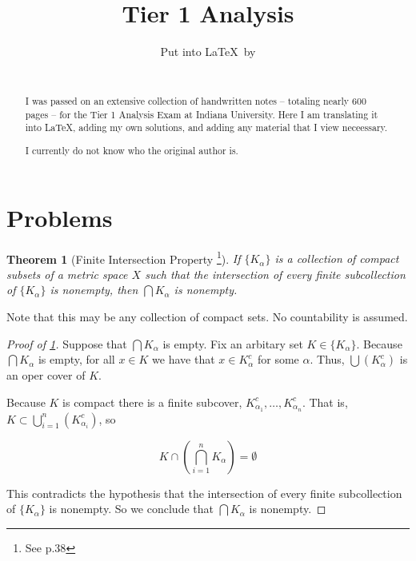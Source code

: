 \documentclass[english]{article}
\date{}
\title{Tier 1 Analysis}
\author{Put into \LaTeX\ by \\ \fullname \\ \textit{\email}}
\DeclareMathOperator{\<}{\langle}
\renewcommand{\>}{\rangle}
\newtheorem{theorem}{Theorem} %
\theoremstyle{definition}
\begin{document}
\begin{minipage}{\textwidth}
    \maketitle
    \begin{abstract}
        I was passed on an extensive collection of handwritten notes -- totaling nearly 600 pages -- for the Tier 1 Analysis Exam at Indiana University. Here I am translating it into \LaTeX, adding my own solutions, and adding any material that I view neceessary. 
        
        I currently do not know who the original author is.
    \end{abstract}
\end{minipage}

\pagebreak

\tableofcontents

\pagebreak

\section{Problems}

\begin{theorem}[Finite Intersection Property \footnote{See \cite{rudin} p.38}]
    \label{thm:finite_intersection}
    If $\{K_{\alpha}\}$ is a collection of compact subsets of a metric space $X$ such that the intersection of every finite subcollection of $\{K_{\alpha}\}$ is nonempty, then $\bigcap K_{\alpha}$ is nonempty. 
\end{theorem}

Note that this may be any collection of compact sets. No countability is assumed.

\begin{proof}[Proof of \cref{thm:finite_intersection}]
    Suppose that $\bigcap K_{\alpha}$ is empty. Fix an arbitary set $K \in \{K_{\alpha}\}$. Because $\bigcap K_{\alpha}$ is empty, for all $x \in K$ we have that $x \in K_{\alpha}^c$ for some $\alpha$. Thus, $\bigcup \left( K_{\alpha}^c \right)$ is an oper cover of $K$. 

    Because $K$ is compact there is a finite subcover, $K_{\alpha_1}^c, \dots, K_{\alpha_n}^c$. That is, $K \subset \bigcup_{i = 1}^n \left( K_{\alpha_i}^c \right)$, so 
    
    \[
        K \cap \left( \bigcap_{i = 1}^n K_{\alpha} \right) = \emptyset
    \]

    This contradicts the hypothesis that the intersection of every finite subcollection of $\{K_{\alpha}\}$ is nonempty. So we conclude that $\bigcap K_{\alpha}$ is nonempty.
\end{proof}
\end{document}
